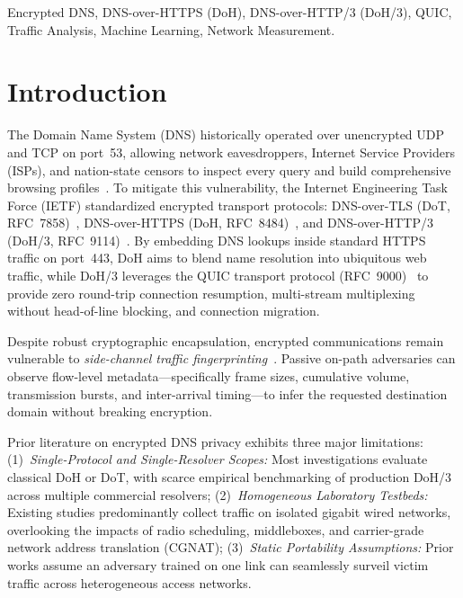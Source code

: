 \documentclass[conference,10pt]{IEEEtran}
\begin{document}
\begin{IEEEkeywords}
Encrypted DNS, DNS-over-HTTPS (DoH), DNS-over-HTTP/3 (DoH/3), QUIC, Traffic Analysis, Machine Learning, Network Measurement.
\end{IEEEkeywords}

\section{Introduction}
\label{sec:intro}

The Domain Name System (DNS) historically operated over unencrypted UDP and TCP on port~53, allowing network eavesdroppers, Internet Service Providers (ISPs), and nation-state censors to inspect every query and build comprehensive browsing profiles~\cite{herrmann2009website}. To mitigate this vulnerability, the Internet Engineering Task Force (IETF) standardized encrypted transport protocols: DNS-over-TLS (DoT, RFC~7858)~\cite{rfc7858}, DNS-over-HTTPS (DoH, RFC~8484)~\cite{rfc8484}, and DNS-over-HTTP/3 (DoH/3, RFC~9114)~\cite{rfc9114,rfc9250}. By embedding DNS lookups inside standard HTTPS traffic on port~443, DoH aims to blend name resolution into ubiquitous web traffic, while DoH/3 leverages the QUIC transport protocol (RFC~9000)~\cite{rfc9000} to provide zero round-trip connection resumption, multi-stream multiplexing without head-of-line blocking, and connection migration.

Despite robust cryptographic encapsulation, encrypted communications remain vulnerable to \emph{side-channel traffic fingerprinting}~\cite{siby2020encrypted,bushart2020padding}. Passive on-path adversaries can observe flow-level metadata---specifically frame sizes, cumulative volume, transmission bursts, and inter-arrival timing---to infer the requested destination domain without breaking encryption. 

Prior literature on encrypted DNS privacy exhibits three major limitations: (1)~\emph{Single-Protocol and Single-Resolver Scopes:} Most investigations evaluate classical DoH or DoT, with scarce empirical benchmarking of production DoH/3 across multiple commercial resolvers; (2)~\emph{Homogeneous Laboratory Testbeds:} Existing studies predominantly collect traffic on isolated gigabit wired networks, overlooking the impacts of radio scheduling, middleboxes, and carrier-grade network address translation (CGNAT); (3)~\emph{Static Portability Assumptions:} Prior works assume an adversary trained on one link can seamlessly surveil victim traffic across heterogeneous access networks.
\end{document}
